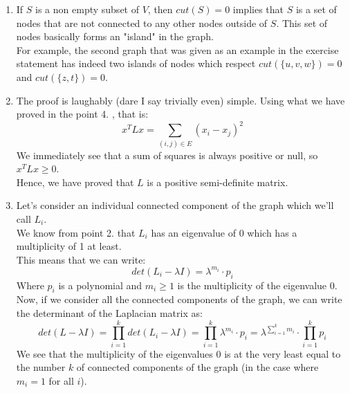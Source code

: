 \documentclass[11pt, legalpaper]{article}
\begin{document}
\begin{enumerate}
            \item If $S$ is a non empty subset of $V$, then $cut(S)=0$ implies that $S$ is a set of nodes that are not connected to any other nodes outside of $S$. This set of nodes basically forms an "island" in the graph. \\
            For example, the second graph that was given as an example in the exercise statement has indeed two islands of nodes which respect $cut(\{u,v,w\})=0$ and $cut(\{z,t\})=0$.

            \item The proof is laughably (dare I say trivially even) simple. Using what we have proved in the point 4. , that is:
            $$x^T L x = \sum_{(i,j)\in E} (x_i-x_j)^2$$
            We immediately see that a sum of squares is always positive or null, so $x^T L x \geq 0$. \\
            Hence, we have proved that $L$ is a positive semi-definite matrix.

            \item Let's consider an individual connected component of the graph which we'll call $L_i$.\\
            We know from point 2. that $L_i$ has an eigenvalue of $0$ which has a multiplicity of 1 at least. \\
            This means that we can write: $$det(L_i-\lambda I)=\lambda^{m_i} \cdot p_i$$ Where $p_i$ is a polynomial and $m_i \geq 1$ is the multiplicity of the eigenvalue $0$.\\
            Now, if we consider all the connected components of the graph, we can write the determinant of the Laplacian matrix as:
            $$det(L-\lambda I)=\prod_{i=1}^{k}det(L_i-\lambda I)=\prod_{i=1}^{k}\lambda^{m_i} \cdot p_i=\lambda^{\sum_{i=1}^{k}m_i} \cdot \prod_{i=1}^{k}p_i$$
            We see that the multiplicity of the eigenvalues $0$ is at the very least equal to the number $k$ of connected components of the graph (in the case where $m_i=1$ for all $i$).
            

\end{enumerate}
\end{document}
